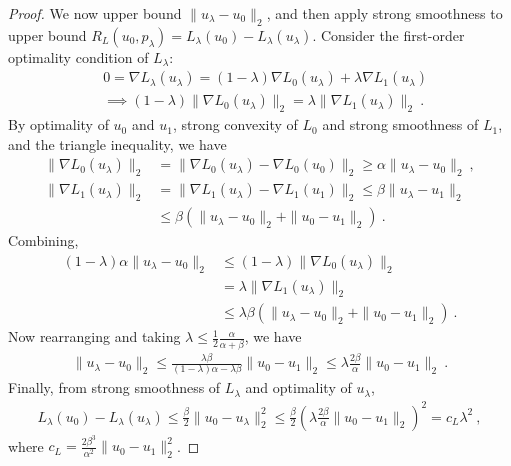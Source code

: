 \begin{proof}
  We now upper bound $\|u_\lambda - u_0\|_2$, and then apply strong smoothness to upper bound $R_L(u_0,p_{\lambda}) = L_\lambda(u_0) - L_\lambda(u_\lambda)$.
  Consider the first-order optimality condition of $L_\lambda$:
  \begin{align*}
    \label{eq:first-order-opt-smooth}
    & 0 = \nabla L_\lambda(u_\lambda) = (1-\lambda) \nabla L_0(u_\lambda) + \lambda \nabla L_1(u_\lambda)
    \\
    & \implies (1-\lambda) \|\nabla L_0(u_\lambda)\|_2 = \lambda \|\nabla L_1(u_\lambda)\|_2~.
  \end{align*}
  By optimality of $u_0$ and $u_1$, strong convexity of $L_0$ and strong smoothness of $L_1$, and the triangle inequality, we have
  \begin{align*}
    \|\nabla L_0(u_\lambda)\|_2 &= \|\nabla L_0(u_\lambda) - \nabla L_0(u_0)\|_2 \geq \alpha \|u_\lambda - u_0\|_2~,
    \\
    \|\nabla L_1(u_\lambda)\|_2 &= \|\nabla L_1(u_\lambda) - \nabla L_1(u_1)\|_2 \leq \beta \|u_\lambda - u_1\|_2
    \\
    &\leq \beta \left( \|u_\lambda - u_0\|_2 + \|u_0 - u_1\|_2 \right)~.
  \end{align*}
  Combining,
  \begin{align*}
    (1-\lambda) \alpha \|u_\lambda - u_0\|_2
    &\leq
      (1-\lambda) \|\nabla L_0(u_\lambda)\|_2
    \\
    &= \lambda \|\nabla L_1(u_\lambda)\|_2
    \\
    &\leq
      \lambda \beta \left( \|u_\lambda - u_0\|_2 + \|u_0 - u_1\|_2 \right)~.
  \end{align*}
  Now rearranging and taking $\lambda \leq \tfrac 1 2 \tfrac {\alpha}{\alpha+\beta}$, we have
  \begin{align*}
    \|u_\lambda - u_0\|_2 \leq \frac{\lambda\beta}{(1-\lambda)\alpha-\lambda\beta} \|u_0 - u_1\|_2  \leq \lambda \frac{2\beta}{\alpha} \|u_0 - u_1\|_2 ~.
  \end{align*}
  Finally, from strong smoothness of $L_\lambda$ and optimality of $u_\lambda$,
  \begin{align*}
    L_\lambda(u_0) - L_\lambda(u_\lambda) \leq \frac{\beta}{2} \|u_0 - u_\lambda\|_2^2 \leq \frac{\beta}{2} \left(\lambda \frac{2\beta}{\alpha} \|u_0 - u_1\|_2\right)^2 = c_L \lambda^2~,
  \end{align*}
  where $c_L = \frac{2\beta^3}{\alpha^2} \|u_0 - u_1\|_2^2$.


\end{proof}
